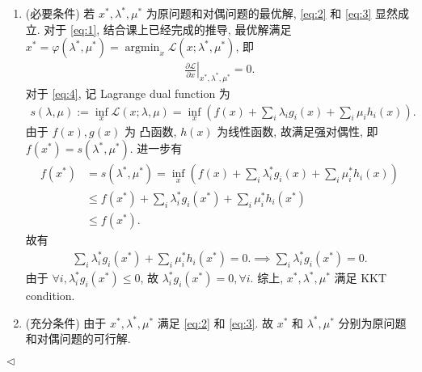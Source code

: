 \documentclass[11pt]{article}
\newenvironment{answer}[1][Solution]{\begin{trivlist}
\item[\hskip \labelsep {\bfseries #1.}\hskip \labelsep]}{\hfill$\lhd$\end{trivlist}}
\newcommand\1{\mathds{1}}
\DeclareMathOperator*{\argmin}{argmin} %
\begin{document}
\begin{answer}
\begin{enumerate}
    \item (必要条件) 若 $x^*, \lambda^*, \mu^*$ 为原问题和对偶问题的最优解, \eqref{eq:2} 和 \eqref{eq:3} 显然成立. 
    对于 \eqref{eq:1}, 结合课上已经完成的推导, 最优解满足 $x^* = \varphi(\lambda^*, \mu^*) = \argmin_x \mathcal{L}(x;\lambda^*, \mu^*)$, 即
    \begin{align*}
        \left.\frac{\partial \mathcal{L}}{\partial x}\right|_{x^*, \lambda^*, \mu^*} = 0.
    \end{align*}
    对于 \eqref{eq:4}, 记 Lagrange dual function 为 
    \begin{align*}
        s(\lambda, \mu) := \inf_x \mathcal{L}(x;\lambda, \mu) = \inf_x \left(f(x) + \sum_i \lambda_i g_i(x) + \sum_i \mu_i h_i(x)\right).
    \end{align*}
    由于 $f(x), g(x)$ 为 凸函数, $h(x)$ 为线性函数, 故满足强对偶性, 即$f(x^*) = s(\lambda^*, \mu^*)$. 进一步有
    \begin{align*}
        f(x^*) &= s(\lambda^*, \mu^*) = \inf_x \left(f(x) + \sum_i \lambda_i^* g_i(x) + \sum_i \mu_i^* h_i(x)\right) \\
        &\le f(x^*) + \sum_i \lambda_i^* g_i(x^*) + \sum_i \mu_i^* h_i(x^*) \\
        &\le f(x^*).
    \end{align*}
    故有
    \begin{align*}
        \sum_{i} \lambda_i^* g_i(x^*) + \sum_{i} \mu_i^* h_i(x^*) = 0. \implies \sum_i \lambda_i^* g_i(x^*) = 0.
    \end{align*}
    由于 $\forall i, \lambda_i^* g_i(x^*)\le 0$, 故 $\lambda_i^* g_i(x^*) = 0, \forall i$. 综上, $x^*, \lambda^*, \mu^*$ 满足 KKT condition.
    \item (充分条件) 由于 $x^*, \lambda^*, \mu^*$ 满足 \eqref{eq:2} 和 \eqref{eq:3}. 故 $x^*$ 和 $\lambda^*,\mu^*$ 分别为原问题和对偶问题的可行解. 
    

\end{enumerate}
\end{answer}
\end{document}
